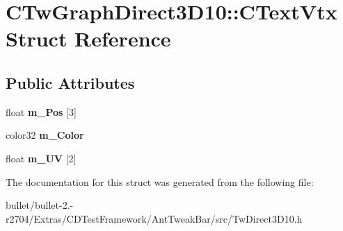 \hypertarget{struct_c_tw_graph_direct3_d10_1_1_c_text_vtx}{\section{C\+Tw\+Graph\+Direct3\+D10\+:\+:C\+Text\+Vtx Struct Reference}
\label{struct_c_tw_graph_direct3_d10_1_1_c_text_vtx}
}
\subsection*{Public Attributes}
\begin{DoxyCompactItemize}
\item 
\hypertarget{struct_c_tw_graph_direct3_d10_1_1_c_text_vtx_a46a2e70ead757824a80cbfe62cab1f2e}{float {\bfseries m\+\_\+\+Pos} \mbox{[}3\mbox{]}}\label{struct_c_tw_graph_direct3_d10_1_1_c_text_vtx_a46a2e70ead757824a80cbfe62cab1f2e}

\item 
\hypertarget{struct_c_tw_graph_direct3_d10_1_1_c_text_vtx_ae70b09118e8c6a8361bb68bba748b631}{color32 {\bfseries m\+\_\+\+Color}}\label{struct_c_tw_graph_direct3_d10_1_1_c_text_vtx_ae70b09118e8c6a8361bb68bba748b631}

\item 
\hypertarget{struct_c_tw_graph_direct3_d10_1_1_c_text_vtx_a28932d2b9ff76ab647e0d7f3c734ab06}{float {\bfseries m\+\_\+\+U\+V} \mbox{[}2\mbox{]}}\label{struct_c_tw_graph_direct3_d10_1_1_c_text_vtx_a28932d2b9ff76ab647e0d7f3c734ab06}

\end{DoxyCompactItemize}


The documentation for this struct was generated from the following file\+:\begin{DoxyCompactItemize}
\item 
bullet/bullet-\/2.-\/r2704/\+Extras/\+C\+D\+Test\+Framework/\+Ant\+Tweak\+Bar/src/Tw\+Direct3\+D10.\+h\end{DoxyCompactItemize}
